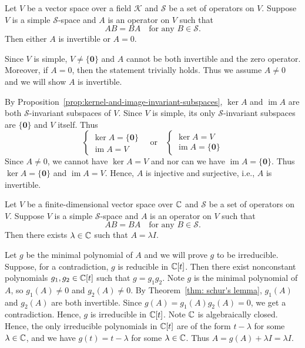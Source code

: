 \begin{theoremenv}\label{thm: schur's lemma}
    Let $V$ be a vector space over a field $\mathcal K$ and $\mathcal S$ be a set of operators on $V$. Suppose $V$ is a simple $\mathcal S$-space and $A$ is an operator on $V$ such that
    $$ AB = BA \quad \text{for any } B \in \mathcal S. $$
    Then either $A$ is invertible or $A=0$.
\end{theoremenv}
\begin{proofenv}
    Since $V$ is simple, $V\ne \{ \bm 0 \}$ and $A$ cannot be both invertible and the zero operator. Moreover, if $A=0$, then the statement trivially holds. Thus we assume $A \ne 0$ and we will show $A$ is invertible.

    By Proposition~\ref{prop:kernel-and-image-invariant-subspaces}, $\ker A$ and $\operatorname{im} A$ are both $\mathcal S$-invariant subspaces of $V$. Since $V$ is simple, its only $\mathcal S$-invariant subspaces are $\{ \bm 0 \}$ and $V$ itself. Thus
    $$ \begin{cases}
        \ker A = \{ \bm 0 \} \\
        \operatorname{im} A = V
    \end{cases}
    \quad \text{or} \quad
    \begin{cases}
        \ker A = V \\
        \operatorname{im} A = \{ \bm 0 \}
    \end{cases}
    $$
    Since $A \ne 0$, we cannot have $\ker A = V$ and nor can we have $\operatorname{im} A = \{ \bm 0 \}$. Thus $\ker A = \{ \bm 0 \}$ and $\operatorname{im} A = V$. Hence, $A$ is injective and surjective, i.e., $A$ is invertible.
\end{proofenv}
\begin{theoremenv}
    Let $V$ be a finite-dimensional vector space over $\mathbb{C}$ and $\mathcal S$ be a set of operators on $V$. Suppose $V$ is a simple $\mathcal S$-space and $A$ is an operator on $V$ such that
    $$ AB = BA \quad \text{for any } B \in \mathcal S. $$
    Then there exists $\lambda \in \mathbb{C}$ such that $A = \lambda I$.
\end{theoremenv}
\begin{proofenv}
    Let $g$ be the minimal polynomial of $A$ and we will prove $g$ to be irreducible. Suppose, for a contradiction, $g$ is reducible in $\mathbb{C}[t]$. Then there exist nonconstant polynomials $g_1, g_2 \in \mathbb{C}[t]$ such that $g = g_1 g_2$. Note $g$ is the minimal polynomial of $A$, so $g_1(A) \ne 0$ and $g_2(A) \ne 0$. By Theorem~\ref{thm: schur's lemma}, $g_1(A)$ and $g_2(A)$ are both invertible. Since $g(A) = g_1(A) g_2(A) = 0$, we get a contradiction. Hence, $g$ is irreducible in $\mathbb{C}[t]$. Note $\mathbb{C}$ is algebraically closed. Hence, the only irreducible polynomials in $\mathbb{C}[t]$ are of the form $t-\lambda$ for some $\lambda \in \mathbb{C}$, and we have $g(t) = t - \lambda$ for some $\lambda \in \mathbb{C}$. Thus $A = g(A) + \lambda I = \lambda I$.
\end{proofenv}

